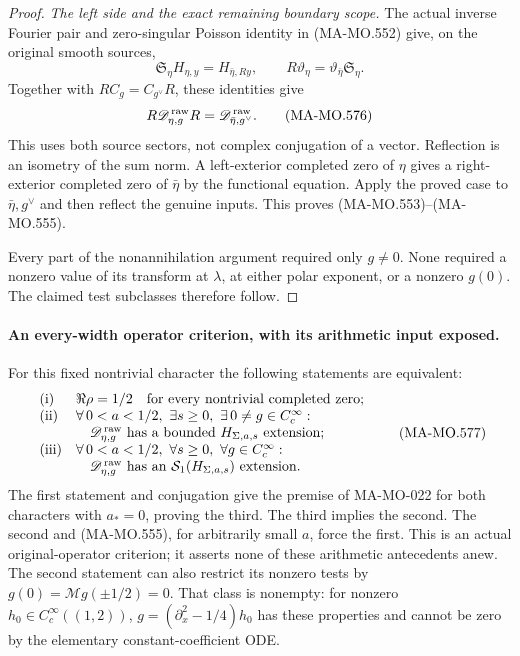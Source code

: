 \begin{proof}
\emph{The left side and the exact remaining boundary scope.}
The actual inverse Fourier pair and zero-singular
Poisson identity in (MA-MO.552) give, on the original
smooth sources,
\[
 \mathfrak S_\eta H_{\eta,y}=H_{\bar\eta,Ry},
 \qquad
 R\vartheta_\eta=\vartheta_{\bar\eta}\mathfrak S_\eta .
\]
Together with \(RC_g=C_{g^\vee}R\), these identities give
\[
           R\mathscr D^{\,\rm raw}_{\eta,g}R
                 =\mathscr D^{\,\rm raw}_{\bar\eta,g^\vee}.
 \tag{MA-MO.576}
\]
This uses both source sectors, not complex conjugation
of a vector. Reflection is an isometry of the sum
norm. A left-exterior completed zero of \(\eta\)
gives a right-exterior completed zero of \(\bar\eta\)
by the functional equation. Apply the proved case to
\(\bar\eta,g^\vee\) and then reflect the genuine inputs.
This proves (MA-MO.553)--(MA-MO.555).

Every part of the nonannihilation argument required
only \(g\ne0\). None required a nonzero value of its
transform at \(\lambda\), at either polar exponent,
or a nonzero \(g(0)\). The claimed test subclasses
therefore follow.
\end{proof}

\paragraph{An every-width operator criterion, with its arithmetic input exposed.}
For this fixed nontrivial character the following statements
are equivalent:
\[
 \begin{array}{ll}
 {\rm (i)}&
   \Re\rho=1/2\quad\text{for every nontrivial completed zero};\\
 {\rm (ii)}&
   \forall\,0<a<1/2,\ \exists s\ge0,\
                          \exists\,0\ne g\in C_c^\infty:\\
 &\quad\mathscr D^{\,\rm raw}_{\eta,g}
       \text{ has a bounded }H_{\Sigma,a,s}\text{ extension};\\
 {\rm (iii)}&
   \forall\,0<a<1/2,\ \forall s\ge0,\
                              \forall g\in C_c^\infty:\\
 &\quad\mathscr D^{\,\rm raw}_{\eta,g}
       \text{ has an }\mathcal S_1(H_{\Sigma,a,s})\text{ extension}.
 \end{array}
 \tag{MA-MO.577}
\]
The first statement and conjugation give the premise of
MA-MO-022 for both characters with \(a_*=0\), proving
the third. The third implies the second. The second
and (MA-MO.555), for arbitrarily small \(a\), force
the first. This is an actual original-operator criterion;
it asserts none of these arithmetic antecedents anew.
The second statement can also restrict its nonzero tests
by \(g(0)=\mathcal Mg(\pm1/2)=0\). That class is
nonempty: for nonzero \(h_0\in C_c^\infty((1,2))\),
\(g=(\partial_x^2-1/4)h_0\) has these properties and
cannot be zero by the elementary constant-coefficient ODE.

